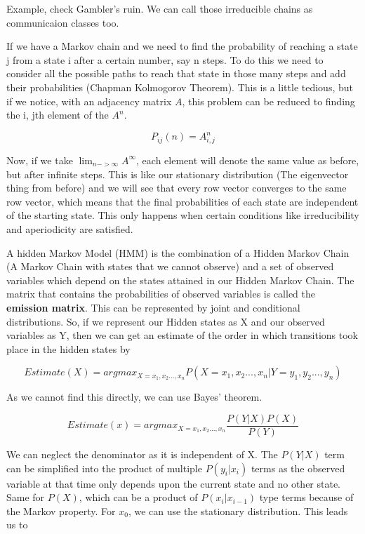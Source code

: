 Example, check Gambler's ruin. We can call those irreducible chains as
communicaion classes too.

If we have a Markov chain and we need to find the probability of
reaching a state j from a state i after a certain number, say n steps.
To do this we need to consider all the possible paths to reach that
state in those many steps and add their probabilities (Chapman
Kolmogorov Theorem). This is a little tedious, but if we notice, with an
adjacency matrix \(A\), this problem can be reduced to finding the i,
jth element of the \(A^n\).

\[P_{ij}(n) = A^{n}_{i, j}\]

Now, if we take \(\displaystyle\lim_{n->\infty} A^{\infty}\), each
element will denote the same value as before, but after infinite steps.
This is like our stationary distribution (The eigenvector thing from
before) and we will see that every row vector converges to the same row
vector, which means that the final probabilities of each state are
independent of the starting state. This only happens when certain
conditions like irreducibility and aperiodicity are satisfied.

A hidden Markov Model (HMM) is the combination of a Hidden Markov Chain
(A Markov Chain with states that we cannot observe) and a set of
observed variables which depend on the states attained in our Hidden
Markov Chain. The matrix that contains the probabilities of observed
variables is called the \textbf{emission matrix}. This can be
represented by joint and conditional distributions. So, if we represent
our Hidden states as X and our observed variables as Y, then we can get
an estimate of the order in which transitions took place in the hidden
states by

\[Estimate(X) = argmax_{X = x_1, x_2..., x_n} P(X = x_1, x_2..., x_n | Y = y_1, y_2..., y_n)\]

As we cannot find this directly, we can use Bayes' theorem.

\[Estimate(x) = argmax_{X = x_1, x_2..., x_n} \frac{P(Y|X)P(X)}{P(Y)}\]

We can neglect the denominator as it is independent of X. The \(P(Y|X)\)
term can be simplified into the product of multiple \(P(y_i|x_i)\) terms
as the observed variable at that time only depends upon the current
state and no other state. Same for \(P(X)\), which can be a product of
\(P(x_i|x_{i-1})\) type terms because of the Markov property. For
\(x_0\), we can use the stationary distribution. This leads us to


